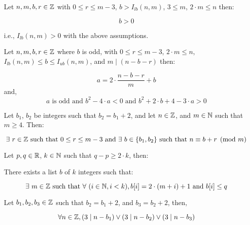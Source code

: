 \begin{lemma}[I lb pos]
    \label{lem:I_lb_pos}
    \leanok
    Let $n,m,b,r\in\mathbb{Z}$ with $0 \leq r \leq m - 3$, $b > I_{lb}(n,m)$, $3 \leq m$, $2 \cdot m \leq n$ then:

    \[
        b > 0
    \]

    i.e., $I_{lb}(n,m) > 0$ with the above assumptions.
    
\end{lemma}

\begin{lemma}[main]
    \label{lem:main}
    \leanok
    Let $n,m,b,r\in\mathbb{Z}$ where $b$ is odd, with $0 \leq r \leq m - 3$, $2\cdot m \leq n$, $I_{lb}(n,m)\leq b \leq I_{ub}(n,m)$, and $m \mid (n-b-r)$ then:

    \[
        a = 2\cdot \frac{n - b - r}{m} + b
    \]
    and,
    \[
       a\text{ is odd and } b^2 - 4\cdot a < 0 \text{ and } b^2 + 2 \cdot b + 4 - 3\cdot a > 0
    \]    
\end{lemma}


\begin{theorem}
    \label{thm:mod_m_congr}
    \leanok
    Let $b_1$, $b_2$ be integers such that $b_2 = b_1 + 2$, and let $n\in \mathbb{Z}$, and $m\in \mathbb{N}$ such that $m \geq 4$. Then:
    
    \[
        \exists\ r \in \mathbb{Z} \text{ such that } 0 \leq r \leq m - 3\text{ and } \exists\ b\in \{b_1, b_2\} \text{ such that } n \equiv b + r \pmod{m}
    \]
\end{theorem}
    
\begin{lemma}[blist]
    \label{lemma:blist}
    \leanok
    Let $p,q\in\mathbb{R}$, $k\in\mathbb{N}$ such that $q - p \geq 2 \cdot k$, then:

    There exists a list $b$ of $k$ integers such that:

    \[
        \exists\ m \in \mathbb{Z}\text{ such that } \forall\ (i \in \mathbb{N}, i < k), b[i] = 2 \cdot (m + i) + 1\text{ and } b[i] \leq q
    \]
\end{lemma}

\begin{lemma}[res b]
    \label{lemma:res_b}
    \leanok
    Let $b_1,b_2,b_3\in\mathbb{Z}$ such that $b_2 = b_1 + 2$, and $b_3 = b_2 + 2$, then,

    \[
        \forall n \in \mathbb{Z}, (3\mid n - b_1)\lor (3 \mid n - b_2) \lor (3 \mid n - b_3)
    \]
\end{lemma}

